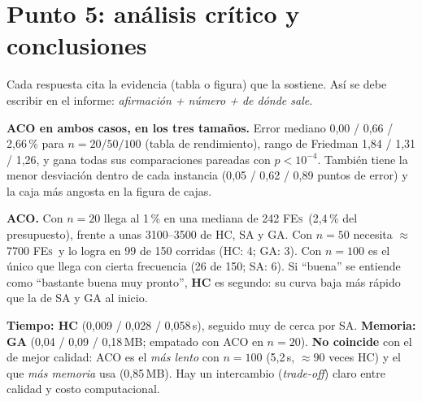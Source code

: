 \documentclass[11pt,a4paper]{article}
\newcommand{\FEs}{\textsc{FEs}}
\begin{document}
\section{Punto 5: análisis crítico y conclusiones}\label{sec:p5}
Cada respuesta cita la evidencia (tabla o figura) que la sostiene. Así se debe escribir en el informe: \emph{afirmación + número + de dónde sale}.

\begin{respuesta}
\textbf{ACO en ambos casos, en los tres tamaños.} Error mediano 0{,}00 / 0{,}66 / 2{,}66\,\% para $n=20/50/100$ (tabla de rendimiento), rango de Friedman
1{,}84 / 1{,}31 / 1{,}26, y gana todas sus comparaciones pareadas con $p<10^{-4}$. También tiene la menor desviación dentro de cada instancia
(0{,}05 / 0{,}62 / 0{,}89 puntos de error) y la caja más angosta en la figura de cajas.
\end{respuesta}

\begin{respuesta}
\textbf{ACO.} Con $n=20$ llega al 1\,\% en una mediana de 242 \FEs\ (2{,}4\,\% del presupuesto), frente a unas 3100--3500 de HC, SA y GA.
Con $n=50$ necesita $\approx$7700 \FEs\ y lo logra en 99 de 150 corridas (HC: 4; GA: 3). Con $n=100$ es el único que llega con cierta frecuencia (26 de 150; SA: 6).
Si ``buena'' se entiende como ``bastante buena muy pronto'', \textbf{HC} es segundo: su curva baja más rápido que la de SA y GA al inicio.
\end{respuesta}

\begin{respuesta}
\textbf{Tiempo: HC} (0{,}009 / 0{,}028 / 0{,}058\,s), seguido muy de cerca por SA. \textbf{Memoria: GA} (0{,}04 / 0{,}09 / 0{,}18\,MB; empatado con ACO en $n=20$).
\textbf{No coincide} con el de mejor calidad: ACO es el \emph{más lento} con $n=100$ (5{,}2\,s, $\approx90$ veces HC) y el que \emph{más memoria} usa (0{,}85\,MB).
Hay un intercambio (\emph{trade-off}) claro entre calidad y costo computacional.
\end{respuesta}
\end{document}
